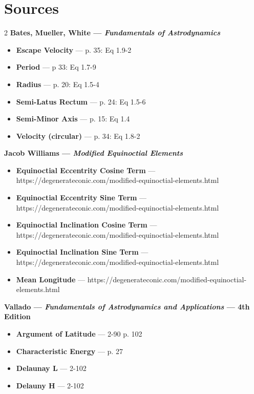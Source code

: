 \documentclass[10pt]{article}
\begin{document}
\section*{Sources}
\begin{footnotesize}
\setlength{\parskip}{0pt}
\setlength{\parindent}{0pt}
\begin{multicols}{2}
\noindent\textbf{Bates, Mueller, White --- \textit{Fundamentals of Astrodynamics}}
\begin{itemize}[noitemsep,topsep=0pt,parsep=0pt,partopsep=0pt]
\item \textbf{Escape Velocity} --- p. 35: Eq 1.9-2
\item \textbf{Period} --- p 33: Eq 1.7-9
\item \textbf{Radius} --- p. 20: Eq 1.5-4
\item \textbf{Semi-Latus Rectum} --- p. 24: Eq 1.5-6
\item \textbf{Semi-Minor Axis} --- p. 15: Eq 1.4
\item \textbf{Velocity (circular)} --- p. 34: Eq 1.8-2
\end{itemize}
\noindent\textbf{Jacob Williams --- \textit{Modified Equinoctial Elements}}
\begin{itemize}[noitemsep,topsep=0pt,parsep=0pt,partopsep=0pt]
\item \textbf{Equinoctial Eccentrity Cosine Term} --- https://degenerateconic.com/modified-equinoctial-elements.html
\item \textbf{Equinoctial Eccentrity Sine Term} --- https://degenerateconic.com/modified-equinoctial-elements.html
\item \textbf{Equinoctial Inclination Cosine Term} --- https://degenerateconic.com/modified-equinoctial-elements.html
\item \textbf{Equinoctial Inclination Sine Term} --- https://degenerateconic.com/modified-equinoctial-elements.html
\item \textbf{Mean Longitude} --- https://degenerateconic.com/modified-equinoctial-elements.html
\end{itemize}
\noindent\textbf{Vallado --- \textit{Fundamentals of Astrodynamics and Applications} --- 4th Edition}
\begin{itemize}[noitemsep,topsep=0pt,parsep=0pt,partopsep=0pt]
\item \textbf{Argument of Latitude} --- 2-90 p. 102
\item \textbf{Characteristic Energy} --- p. 27
\item \textbf{Delaunay L} --- 2-102
\item \textbf{Delauny H} --- 2-102

\end{itemize}
\end{multicols}
\end{footnotesize}
\end{document}
